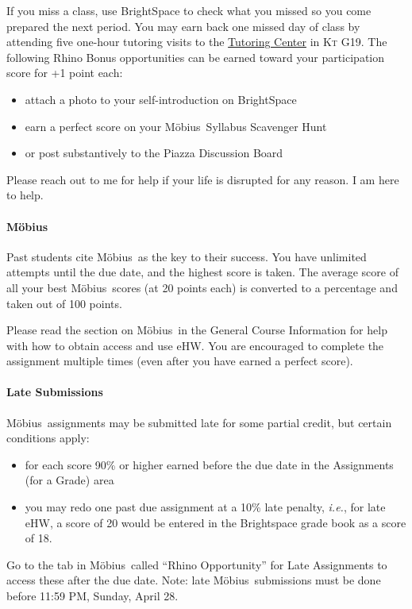 \documentclass[letterpaper,twoside]{article}
\def\Mobius{M\"obius\ }
\newcommand\Ie[1]{\textit{i.e.}, #1}
\newenvironment{SorrellItemize}
{
    \setlength\parskip{-5pt}
    \begin{itemize}[leftmargin=11pt]
        \setlength\itemsep{-4pt}
}{
    \end{itemize}
}
\begin{document}
\begin{multicols*}{2}
    If you miss a class, use BrightSpace to check what you missed so you come prepared the next period.
    You may earn back one missed day of class by attending five one-hour tutoring visits to the \href{https://www.pfw.edu/offices/learning-support/}{Tutoring Center} in \textsc{Kt} G19.
    The following Rhino Bonus opportunities can be earned toward your participation score for +1 point each:
    \begin{SorrellItemize}
        \item attach a photo to your self-introduction on BrightSpace
        \item earn a perfect score on your \Mobius Syllabus Scavenger Hunt
        \item or post substantively to the Piazza Discussion Board
    \end{SorrellItemize}
    Please reach out to me for help if your life is disrupted for any reason.
    I am here to help.

    \paragraph{\Mobius}
    Past students cite \Mobius as the key to their success.
    You have unlimited attempts until the due date, and the highest score is taken.
    The average score of all your best \Mobius scores (at 20 points each) is converted to a percentage and taken out of 100 points.

    Please read the section on \Mobius in the General Course Information for help with how to obtain access and use eHW.
    You are encouraged to complete the assignment multiple times (even after you have earned a perfect score).

    \paragraph{Late Submissions}
    \Mobius assignments may be submitted late for some partial credit, but certain conditions apply:
    \begin{SorrellItemize}
        \item for each score 90\% or higher earned before the due date in the Assignments (for a Grade) area
        \item you may redo one past due assignment at a 10\% late penalty, \Ie{for late eHW, a score of 20 would be entered in the Brightspace grade book as a score of 18}.
    \end{SorrellItemize}
    Go to the tab in \Mobius called ``Rhino Opportunity'' for Late Assignments to access these after the due date. 
    Note: late \Mobius submissions must be done before 11:59 PM, Sunday, April 28.


\end{multicols*}
\end{document}
